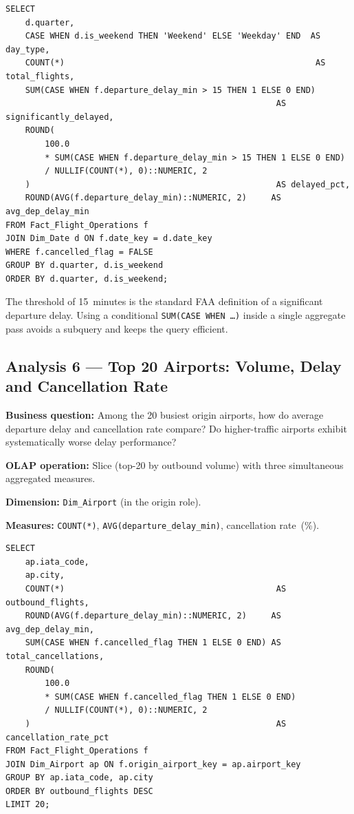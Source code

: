 \documentclass[12pt,a4paper]{article}
\begin{document}
\begin{lstlisting}[style=sql]
SELECT
    d.quarter,
    CASE WHEN d.is_weekend THEN 'Weekend' ELSE 'Weekday' END  AS day_type,
    COUNT(*)                                                   AS total_flights,
    SUM(CASE WHEN f.departure_delay_min > 15 THEN 1 ELSE 0 END)
                                                       AS significantly_delayed,
    ROUND(
        100.0
        * SUM(CASE WHEN f.departure_delay_min > 15 THEN 1 ELSE 0 END)
        / NULLIF(COUNT(*), 0)::NUMERIC, 2
    )                                                  AS delayed_pct,
    ROUND(AVG(f.departure_delay_min)::NUMERIC, 2)     AS avg_dep_delay_min
FROM Fact_Flight_Operations f
JOIN Dim_Date d ON f.date_key = d.date_key
WHERE f.cancelled_flag = FALSE
GROUP BY d.quarter, d.is_weekend
ORDER BY d.quarter, d.is_weekend;
\end{lstlisting}

The threshold of 15~minutes is the standard FAA definition of a significant
departure delay. Using a conditional \texttt{SUM(CASE WHEN \ldots)} inside
a single aggregate pass avoids a subquery and keeps the query efficient.

\subsection{Analysis 6 — Top 20 Airports: Volume, Delay and Cancellation Rate}

\textbf{Business question:} Among the 20 busiest origin airports, how do
average departure delay and cancellation rate compare? Do higher-traffic
airports exhibit systematically worse delay performance?

\textbf{OLAP operation:} Slice (top-20 by outbound volume) with three
simultaneous aggregated measures.

\textbf{Dimension:} \texttt{Dim\_Airport} (in the origin role).

\textbf{Measures:} \texttt{COUNT(*)}, \texttt{AVG(departure\_delay\_min)},
cancellation rate~(\%).

\begin{lstlisting}[style=sql]
SELECT
    ap.iata_code,
    ap.city,
    COUNT(*)                                           AS outbound_flights,
    ROUND(AVG(f.departure_delay_min)::NUMERIC, 2)     AS avg_dep_delay_min,
    SUM(CASE WHEN f.cancelled_flag THEN 1 ELSE 0 END) AS total_cancellations,
    ROUND(
        100.0
        * SUM(CASE WHEN f.cancelled_flag THEN 1 ELSE 0 END)
        / NULLIF(COUNT(*), 0)::NUMERIC, 2
    )                                                  AS cancellation_rate_pct
FROM Fact_Flight_Operations f
JOIN Dim_Airport ap ON f.origin_airport_key = ap.airport_key
GROUP BY ap.iata_code, ap.city
ORDER BY outbound_flights DESC
LIMIT 20;
\end{lstlisting}
\end{document}
